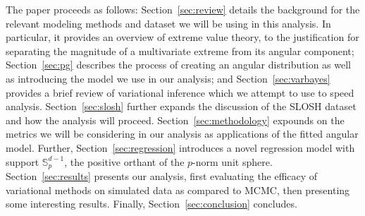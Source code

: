 
The paper proceeds as follows:  Section~\ref{sec:review} details the background 
    for the relevant modeling methods and dataset we will be using in this analysis.  
    In particular, it provides an overview of extreme value 
    theory, to the justification for separating the magnitude of a multivariate 
    extreme from its angular component; Section~\ref{sec:pg} describes the process 
    of creating an angular distribution as well as introducing the model we use in 
    our analysis; and Section~\ref{sec:varbayes} provides a brief review of variational
    inference which we attempt to use to speed analysis.  Section~\ref{sec:slosh} further
    expands the discussion of the SLOSH dataset and how the analysis will proceed.
    Section~\ref{sec:methodology} expounds on the metrics we will be considering in
    our analysis as applications of the fitted angular model.  Further, 
    Section~\ref{sec:regression} introduces a novel regression model with support
    $\mathbb{S}_{p}^{d-1}$, the positive orthant of the $p$-norm unit sphere.
    Section~\ref{sec:results} presents our analysis, first evaluating the efficacy of
    variational methods on simulated data as compared to MCMC, then
    presenting some interesting results. Finally, Section~\ref{sec:conclusion} 
    concludes.


